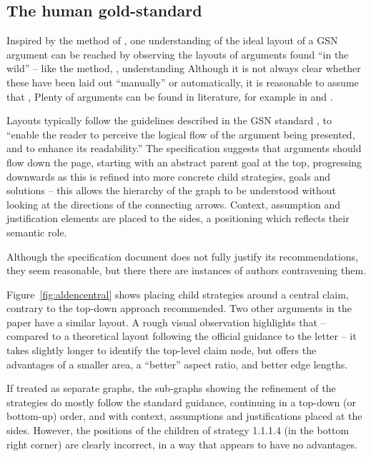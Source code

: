 \subsection{The human gold-standard \label{sec:humangold}}

Inspired by the method of \citet{5674033}, one understanding of the ideal layout of a GSN argument can be reached by observing the layouts of arguments found ``in the wild'' -- like the method, , understanding 
Although it is not always clear whether these have been laid out ``manually'' or automatically, it is reasonable to assume that , 
Plenty of arguments can be found in literature, for example in \cite{Habli:2006:PPC:1183088.1183090} and  \cite{insilico}.

Layouts typically follow the guidelines described in the GSN standard \citep[section~2.2, pp.~26--27]{gsnstandard},
to ``enable the reader to perceive the logical flow of the argument being presented, and to enhance its readability.''
The specification suggests that arguments should flow down the page, starting with an abstract parent goal at the top, progressing downwards as this is refined into more concrete child strategies, goals and solutions -- this allows the hierarchy of the graph to be understood without looking at the directions of the connecting arrows.
Context, assumption and justification elements are placed to the sides, a positioning which reflects their semantic role.

Although the specification document does not fully justify its recommendations, they seem reasonable, but there there are instances of authors contravening them.

Figure~\ref{fig:aldencentral} shows \citet{royal} placing child strategies around a central claim, contrary to the top-down approach recommended. Two other arguments in the paper \cite[pp.~8--9]{royal} have a similar layout.
A rough visual observation highlights that -- compared to a theoretical layout following the official guidance to the letter -- it takes slightly longer to identify the top-level claim node, but offers the advantages of a smaller area, a ``better'' aspect ratio, and better edge lengths. 

If treated as separate graphs, the sub-graphs showing the refinement of the strategies do mostly follow the standard guidance, continuing in a top-down (or bottom-up) order, and with context, assumptions and justifications placed at the sides. However, the positions of the children of strategy 1.1.1.4 (in the bottom right corner) are clearly incorrect, in a way that appears to have no advantages.


